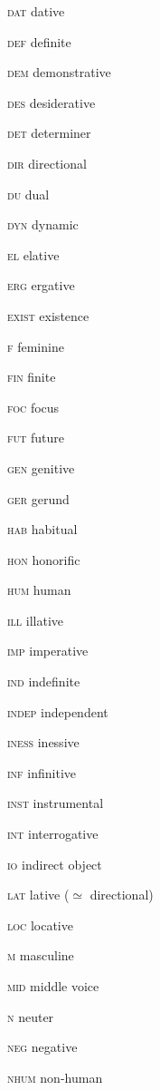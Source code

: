 \begin{refsection}
\begin{multicols}{2}
	\textsc{dat}  dative
	
	\textsc{def}  definite
	
	\textsc{dem}  demonstrative
	
	\textsc{des}  desiderative
	
	\textsc{det}  determiner
	
	\textsc{dir}  directional
	
	\textsc{du}  dual
	
	\textsc{dyn}  dynamic
	
	\textsc{el}  elative
	
	\textsc{erg}  ergative
	
	\textsc{exist}  existence
	
	\textsc{f}  feminine
	
	\textsc{fin}  finite
	
	\textsc{foc}  focus
	
	\textsc{fut}  future
	
	\textsc{gen}  genitive

	
	\textsc{ger}  gerund
	
	\textsc{hab}  habitual
	
	\textsc{hon}  honorific
	
	\textsc{hum}  human
	
	\textsc{ill}  illative
	
	\textsc{imp}  imperative
	
	\textsc{ind}  indefinite
	
	\textsc{indep}  independent
	
	\textsc{iness}  inessive
	
	\textsc{inf}  infinitive
	
	\textsc{inst}  instrumental
	
	\textsc{int}  interrogative
	
	\textsc{io}  indirect object
	
	\textsc{lat}  lative (${\simeq}$ directional)
	
	\textsc{loc}  locative
	
	\textsc{m}  masculine
	
	\textsc{mid}  middle voice
	
	\textsc{n}  neuter
	
	\textsc{neg}  negative
	
	\textsc{nhum}  non-human
	

\end{multicols}
\end{refsection}
